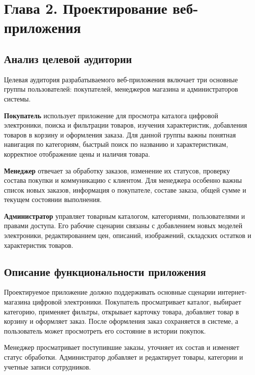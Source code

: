\section*{Глава 2. Проектирование веб-приложения}

\subsection{Анализ целевой аудитории}

Целевая аудитория разрабатываемого веб-приложения включает три основные группы пользователей:
покупателей, менеджеров магазина и администраторов системы.

\textbf{Покупатель} использует приложение для просмотра каталога цифровой электроники,
поиска и фильтрации товаров, изучения характеристик, добавления товаров в корзину и
оформления заказа. Для данной группы важны понятная навигация по категориям, быстрый
поиск по названию и характеристикам, корректное отображение цены и наличия товара.

\textbf{Менеджер} отвечает за обработку заказов, изменение их статусов, проверку состава
покупки и коммуникацию с клиентом. Для менеджера особенно важны список новых заказов,
информация о покупателе, составе заказа, общей сумме и текущем состоянии выполнения.

\textbf{Администратор} управляет товарным каталогом, категориями, пользователями и правами
доступа. Его рабочие сценарии связаны с добавлением новых моделей электроники, редактированием
цен, описаний, изображений, складских остатков и характеристик товаров.

\subsection{Описание функциональности приложения}

Проектируемое приложение должно поддерживать основные сценарии интернет-магазина цифровой
электроники. Покупатель просматривает каталог, выбирает категорию, применяет фильтры,
открывает карточку товара, добавляет товар в корзину и оформляет заказ. После оформления
заказ сохраняется в системе, а пользователь может просмотреть его состояние в истории покупок.

Менеджер просматривает поступившие заказы, уточняет их состав и изменяет статус обработки.
Администратор добавляет и редактирует товары, категории и учетные записи сотрудников.

